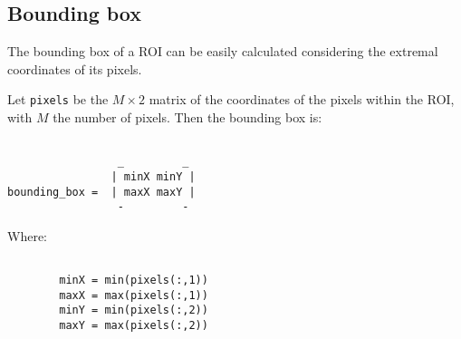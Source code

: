     \subsection{Bounding box}\label{subsection:bounding_box}
        \par{
            The bounding box of a ROI can be easily calculated considering the extremal coordinates of its pixels.
        }
        \par{
            Let \texttt{pixels} be the $M \times 2$ matrix of the coordinates of the pixels within the ROI, with $M$ the number of pixels. Then the bounding box is: 
        }
        \par{
            \begin{BVerbatim}

                 _         _         
                | minX minY |
bounding_box =  | maxX maxY |
                 -         - 
            \end{BVerbatim}
        }
        \par{
            Where:
        }
        \par{
            \begin{BVerbatim} 

        minX = min(pixels(:,1))
        maxX = max(pixels(:,1))
        minY = min(pixels(:,2))
        maxY = max(pixels(:,2))
   
            \end{BVerbatim}
        }